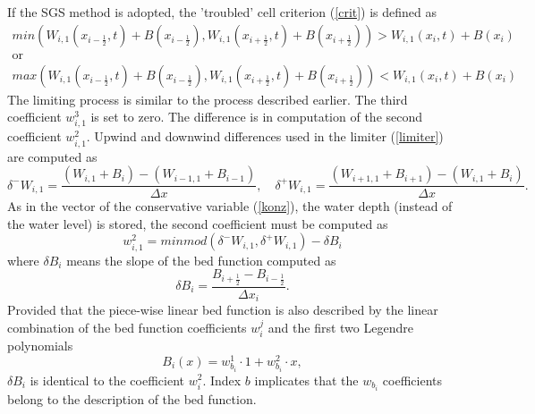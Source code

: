 If the SGS method is adopted, the 'troubled' cell criterion (\ref{crit}) is defined as
\begin{equation}\label{critH}
\begin{array}{c}
 min\left(W_{i,1}(x_{i-\frac12},t)+B(x_{i-\frac12}),W_{i,1}(x_{i+\frac12},t)+B(x_{i+\frac12})\right)>W_{i,1}(x_i,t)+B(x_i)\\
\text{or}\\
 max\left(W_{i,1}(x_{i-\frac12},t)+B(x_{i-\frac12}),W_{i,1}(x_{i+\frac12},t)+B(x_{i+\frac12})\right)< W_{i,1}(x_i,t)+B(x_i)
 \end{array}
\end{equation}
The limiting process is similar to the process described earlier. The third coefficient $w_{i,1}^{3}$ is set to zero. The difference is in computation of the second coefficient $w_{i,1}^{2}$. Upwind and downwind differences used in the limiter (\ref{limiter}) are computed as
\begin{equation}\label{diffH}
\delta^- W_{i,1}=\frac{\left(W_{i,1}+B_{i}\right) - \left(W_{i-1,1}+B_{i-1} \right)}{\Delta x},\quad \delta^+W_{i,1}=\frac{\left(W_{i+1,1}+B_{i+1}\right) - \left(W_{i,1}+B_{i} \right)}{\Delta x}.
\end{equation}
As in the vector of the conservative variable (\ref{konz}), the water depth (instead of the water level) is stored, the second coefficient must be computed as
\begin{equation}
w_{i,1}^{2}=minmod(\delta^- W_{i,1},\delta^+ W_{i,1})-\delta B_i
\end{equation}
where $\delta B_i$ means the slope of the bed function computed as
\begin{equation}
\delta B_i=\frac{B_{i+\frac12}-B_{i-\frac12}}{\Delta x_i}.
\end{equation}
 Provided that the piece-wise linear bed function is also described by the linear combination of the bed function coefficients $w_{i}^j$ and the first two Legendre polynomials
\begin{equation}
 B_i(x)=w_{b_{i}}^1 \cdot 1+w_{b_{i}}^2 \cdot x,
 \end{equation}
 $\delta B_i$ is identical to the coefficient $w_{i}^2$. Index $b$ implicates that the $w_{b_{i}}$ coefficients belong to the description of the bed function.

